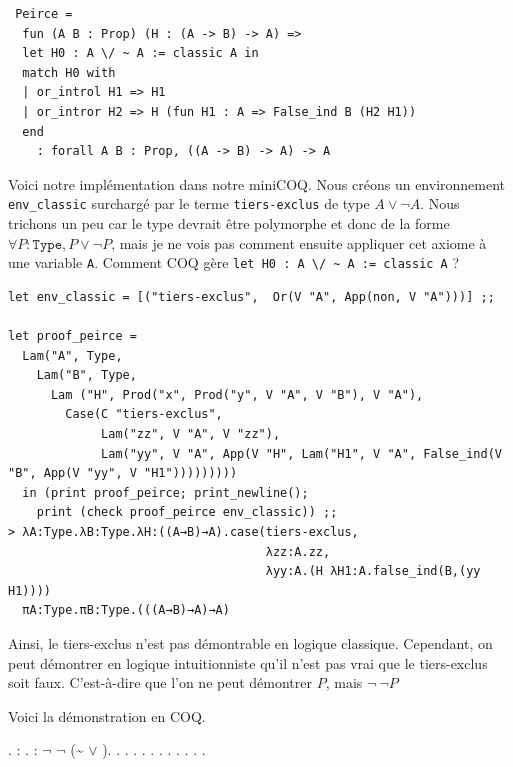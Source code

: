 \documentclass[11pt]{book}
\begin{document}
\begin{Verbatim}
 Peirce = 
  fun (A B : Prop) (H : (A -> B) -> A) =>
  let H0 : A \/ ~ A := classic A in
  match H0 with
  | or_introl H1 => H1
  | or_intror H2 => H (fun H1 : A => False_ind B (H2 H1))
  end
    : forall A B : Prop, ((A -> B) -> A) -> A
\end{Verbatim}

Voici notre implémentation dans notre miniCOQ. 
Nous créons un environnement \verb+env_classic+ surchargé par le terme \verb+tiers-exclus+ de type $A \vee \neg A$.
Nous trichons un peu car le type devrait être polymorphe et donc de la forme $\forall P:\mathtt{Type}, P \vee \neg P$, mais 
je ne vois pas comment ensuite appliquer cet axiome à une variable \verb+A+. Comment COQ gère \verb+let H0 : A \/ ~ A := classic A+ ? 

\begin{Verbatim}
let env_classic = [("tiers-exclus",  Or(V "A", App(non, V "A")))] ;;

let proof_peirce = 
  Lam("A", Type,
    Lam("B", Type, 
      Lam ("H", Prod("x", Prod("y", V "A", V "B"), V "A"),
        Case(C "tiers-exclus",
             Lam("zz", V "A", V "zz"),
             Lam("yy", V "A", App(V "H", Lam("H1", V "A", False_ind(V "B", App(V "yy", V "H1")))))))))
  in (print proof_peirce; print_newline();
    print (check proof_peirce env_classic)) ;;
> λA:Type.λB:Type.λH:((A→B)→A).case(tiers-exclus,
                                    λzz:A.zz,
                                    λyy:A.(H λH1:A.false_ind(B,(yy H1))))
  πA:Type.πB:Type.(((A→B)→A)→A)
\end{Verbatim}

Ainsi, le tiers-exclus n'est pas démontrable en logique classique. Cependant, on peut
démontrer en logique intuitionniste qu'il n'est pas vrai que le tiers-exclus soit faux.
C'est-à-dire que l'on ne peut démontrer $P$, mais $\lnot\ \lnot P$

Voici la démonstration en COQ.

\begin{coqdoccode}
\coqdocnoindent
{} .\coqdoceol
\coqdocnoindent
{}  : .\coqdoceol
\coqdocemptyline
\coqdocnoindent
{} : \ensuremath{\lnot} \ensuremath{\lnot} (\~{} \ensuremath{\lor} ).\coqdoceol
\coqdocnoindent
{}.\coqdoceol
\coqdocindent{1.00em}
 .\coqdoceol
\coqdocindent{1.00em}
 .\coqdoceol
\coqdocindent{1.00em}
 .\coqdoceol
\coqdocindent{1.00em}
.\coqdoceol
\coqdocindent{1.00em}
 .\coqdoceol
\coqdocemptyline
\coqdocindent{1.00em}
 .\coqdoceol
\coqdocindent{1.00em}
.\coqdoceol
\coqdocindent{1.00em}
.\coqdoceol
\coqdocnoindent
{}.\coqdoceol
\coqdocemptyline
\coqdocnoindent
{} .\coqdoceol
\end{coqdoccode}
\end{document}
